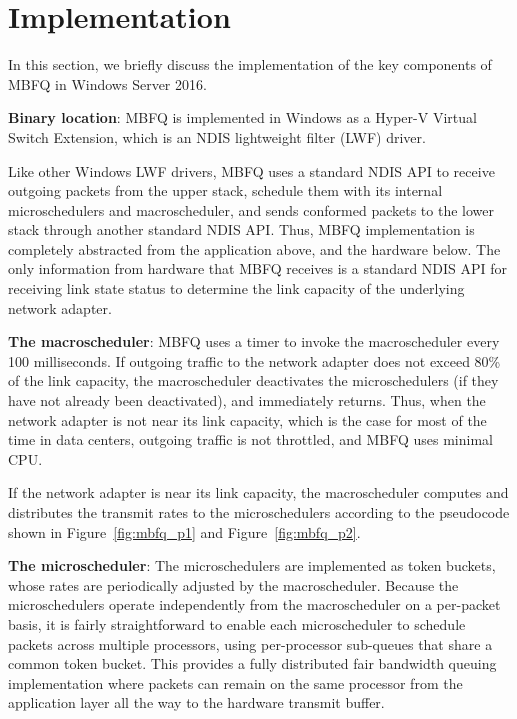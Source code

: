 \section{Implementation}
\label{sec:implementation}
In this section, we briefly discuss the implementation of the key components of MBFQ in Windows
Server 2016.

{\bf Binary location}: MBFQ is implemented in Windows as a Hyper-V Virtual Switch Extension, 
which is an NDIS lightweight filter (LWF) driver.

Like other Windows LWF drivers, MBFQ uses a standard NDIS API to receive outgoing packets
from the upper stack, schedule them with its internal microschedulers and macroscheduler, and 
sends conformed packets to the lower stack through another standard NDIS API.
Thus, MBFQ implementation is completely abstracted from the application above, and the 
hardware below.  The only information from hardware that MBFQ receives is a standard NDIS API 
for receiving link state status to determine the link capacity of the underlying network adapter.

{\bf The macroscheduler}: MBFQ uses a timer to invoke the macroscheduler every 100 milliseconds.
If outgoing traffic to the network adapter does not exceed 80\% of the link capacity, the
macroscheduler deactivates the microschedulers (if they have not already been deactivated), and
immediately returns.  Thus, when the network adapter is not near its link capacity, which is the case
for most of the time in data centers, outgoing traffic is not throttled, and MBFQ uses minimal CPU.

If the network adapter is near its link capacity, the macroscheduler computes and distributes the
transmit rates to the microschedulers according to the pseudocode shown in  
Figure~\ref{fig:mbfq_p1} and Figure~\ref{fig:mbfq_p2}.

{\bf The microscheduler}: The microschedulers are implemented as token buckets, whose rates are
periodically adjusted by the macroscheduler. Because the microschedulers operate independently from
the macroscheduler on a per-packet basis, it is fairly straightforward to enable each microscheduler to 
schedule packets across multiple processors, using per-processor sub-queues that share a common 
token bucket. This provides a fully distributed fair bandwidth queuing implementation where packets can remain
on the same processor from the application layer all the way to the hardware transmit buffer.


